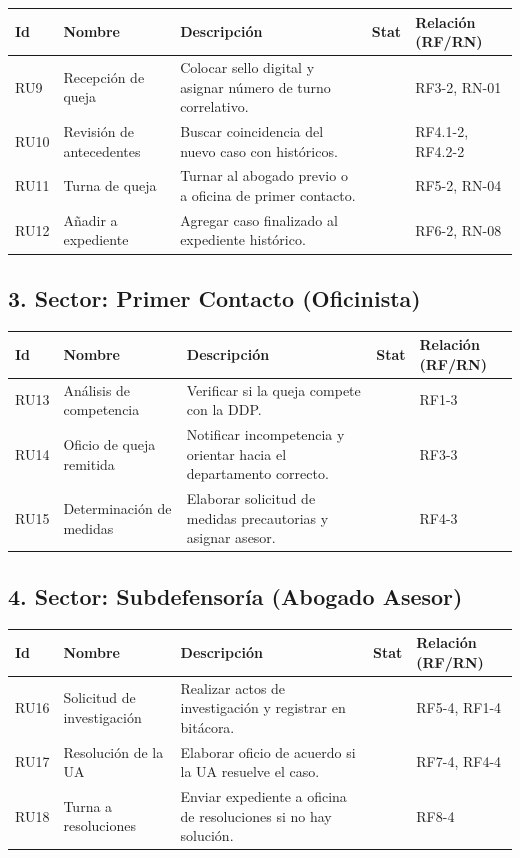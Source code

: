 \documentclass{article}
\begin{document}
\begin{longtable}{|l|p{3cm}|p{6cm}|c|p{2.5cm}|}
\hline
\textbf{Id} & \textbf{Nombre} & \textbf{Descripción} & \textbf{Stat} & \textbf{Relación (RF/RN)} \\ \hline
RU9 & Recepción de queja & Colocar sello digital y asignar número de turno correlativo. & & RF3-2, RN-01  \\ \hline
RU10 & Revisión de antecedentes & Buscar coincidencia del nuevo caso con históricos. & & RF4.1-2, RF4.2-2  \\ \hline
RU11 & Turna de queja & Turnar al abogado previo o a oficina de primer contacto. & & RF5-2, RN-04  \\ \hline
RU12 & Añadir a expediente & Agregar caso finalizado al expediente histórico. & & RF6-2, RN-08  \\ \hline
\end{longtable}

\subsection*{3. Sector: Primer Contacto (Oficinista)}

\begin{longtable}{|l|p{3cm}|p{6cm}|c|p{2.5cm}|}
\hline
\textbf{Id} & \textbf{Nombre} & \textbf{Descripción} & \textbf{Stat} & \textbf{Relación (RF/RN)} \\ \hline
RU13 & Análisis de competencia & Verificar si la queja compete con la DDP. & & RF1-3  \\ \hline
RU14 & Oficio de queja remitida & Notificar incompetencia y orientar hacia el departamento correcto. & & RF3-3  \\ \hline
RU15 & Determinación de medidas & Elaborar solicitud de medidas precautorias y asignar asesor. & & RF4-3  \\ \hline
\end{longtable}

\subsection*{4. Sector: Subdefensoría (Abogado Asesor)}

\begin{longtable}{|l|p{3cm}|p{6cm}|c|p{2.5cm}|}
\hline
\textbf{Id} & \textbf{Nombre} & \textbf{Descripción} & \textbf{Stat} & \textbf{Relación (RF/RN)} \\ \hline
RU16 & Solicitud de investigación & Realizar actos de investigación y registrar en bitácora. & & RF5-4, RF1-4  \\ \hline
RU17 & Resolución de la UA & Elaborar oficio de acuerdo si la UA resuelve el caso. & & RF7-4, RF4-4  \\ \hline
RU18 & Turna a resoluciones & Enviar expediente a oficina de resoluciones si no hay solución. & & RF8-4  \\ \hline
\end{longtable}
\end{document}
